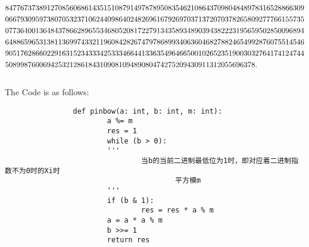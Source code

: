 \documentclass{article}
\theoremstyle{break}
\begin{document}
\begin{enumerate}
\[\begin{aligned}
                &8477673738912708560686143515108791497878950835462108643709804848978316528866309\\
                &0667930959738070532371062440986402482696167926970371372070378265809277766155735\\
                &0773640013648437866289655346805208172279134358934890394382223195659502850096894\\
                &6488659653138113699743321196084282674797868993406360468278824654992876075514546\\
                &9051762866022916315234333425333466441336354964665001026523519003032764174124744\\
                &508998760069425321286184310908109489080474275209430911312055696378.\\
                \leavevmode\\
        \end{aligned}
        \]
        \newpage
        The Code is as follows:\\
        \begin{lstlisting}
                def pinbow(a: int, b: int, m: int):
                        a %= m
                        res = 1
                        while (b > 0):
                        '''
                                当b的当前二进制最低位为1时，即对应着二进制指数不为0时的Xi时
                                        平方模m
                        '''
                        if (b & 1): 
                                res = res * a % m
                        a = a * a % m
                        b >>= 1
                        return res
                

\end{lstlisting}
\end{enumerate}
\end{document}
